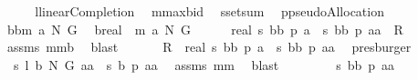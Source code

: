 \begin{isabellebody}
%
\isadelimproof
%
\endisadelimproof
%
\isatagproof
{}\isamarkupfalse%
\ {\isacharminus}\isanewline
\ \ \isamarkupfalse%
\ {\isacharquery}l{\isacharequal}linearCompletion{\isacharprime}\ \isamarkupfalse%
\ {\isacharquery}m{\isacharequal}maxbid{\isacharprime}\ \isamarkupfalse%
\ {\isacharquery}s{\isacharequal}setsum\ \isamarkupfalse%
\ {\isacharquery}p{\isacharequal}pseudoAllocation\isanewline
\ \ \isamarkupfalse%
\ {\isacharquery}bb{\isacharequal}{\isachardoublequoteopen}{\isacharquery}m\ a\ N\ G{\isachardoublequoteclose}\ \isamarkupfalse%
\ {\isacharquery}b{\isacharequal}{\isachardoublequoteopen}real\ {\isasymcirc}\ {\isacharparenleft}{\isacharquery}m\ a\ N\ G{\isacharparenright}{\isachardoublequoteclose}\ \ \isanewline
\ \ \isamarkupfalse%
\ {\isachardoublequoteopen}real\ {\isacharparenleft}{\isacharquery}s\ {\isacharquery}bb\ {\isacharparenleft}{\isacharquery}p\ a{\isacharparenright}{\isacharparenright}\ {\isacharminus}\ {\isacharparenleft}{\isacharquery}s\ {\isacharquery}bb\ {\isacharparenleft}{\isacharquery}p\ aa{\isacharparenright}{\isacharparenright}\ {\isacharequal}\ {\isacharquery}R{\isachardoublequoteclose}\ \isamarkupfalse%
\ assms\ mm{}{}b\ \isamarkupfalse%
\ blast\ \isanewline
\ \ \isamarkupfalse%
\ \isamarkupfalse%
\ {\isachardoublequoteopen}{\isacharquery}R\ {\isacharequal}\ real\ {\isacharparenleft}{\isacharquery}s\ {\isacharquery}bb\ {\isacharparenleft}{\isacharquery}p\ a{\isacharparenright}{\isacharparenright}\ {\isacharminus}\ {\isacharparenleft}{\isacharquery}s\ {\isacharquery}bb\ {\isacharparenleft}{\isacharquery}p\ aa{\isacharparenright}{\isacharparenright}{\isachardoublequoteclose}\ \isamarkupfalse%
\ presburger\isanewline
\ \ \isamarkupfalse%
\ {\isachardoublequoteopen}\ {\isacharquery}s\ {\isacharparenleft}{\isacharquery}l\ {\isacharquery}b\ N\ G{\isacharparenright}\ aa\ {\isacharequal}\ {\isacharquery}s\ {\isacharquery}b\ {\isacharparenleft}{\isacharquery}p\ aa{\isacharparenright}{\isachardoublequoteclose}\ \isamarkupfalse%
\ assms\ mm{}{}\ \isamarkupfalse%
\ blast\ \isamarkupfalse%
\ \isamarkupfalse%
\ \isanewline
\ \ {\isachardoublequoteopen}{\isachardot}{\isachardot}{\isachardot}\ {\isacharequal}\ {\isacharquery}s\ {\isacharquery}bb\ {\isacharparenleft}{\isacharquery}p\ aa{\isacharparenright}{\isachardoublequoteclose}\ \isamarkupfalse%

\end{isabellebody}
